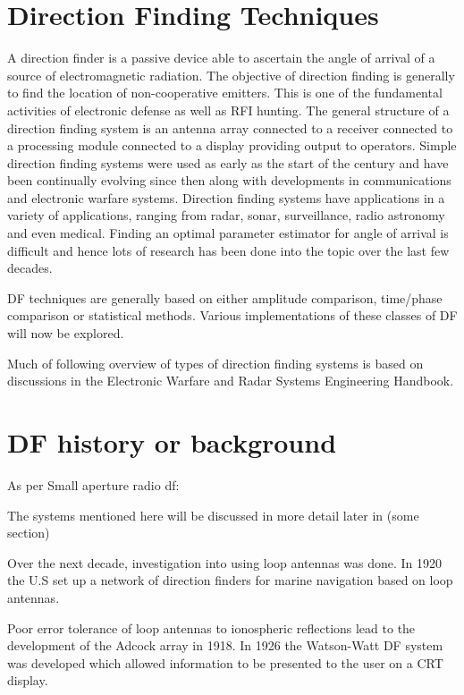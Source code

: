 \section{Direction Finding Techniques}
A direction finder is a passive device able to ascertain the angle of arrival of a source of electromagnetic radiation.
The objective of direction finding is generally to find the location of non-cooperative emitters\cite{poisel2012electronic}.
This is one of the fundamental activities of electronic defense as well as RFI hunting.
The general structure of a direction finding system is an antenna array connected to a receiver connected to a processing module connected to a display providing output to operators.
Simple direction finding systems were used as early as the start of the  century and have been continually evolving since then along with developments in communications and electronic warfare systems.
Direction finding systems have applications in a variety of applications, ranging from radar, sonar, surveillance, radio astronomy and even medical. Finding an optimal parameter estimator for angle of arrival is difficult and hence lots of research has been done into the topic over the last few decades\cite{van2004detection}.

DF techniques are generally based on either amplitude comparison, time/phase comparison or statistical methods\cite{tuncer2009classical}. 
Various implementations of these classes of DF will now be explored.

Much of following overview of types of direction finding systems is based on discussions in the Electronic Warfare and Radar Systems Engineering Handbook\cite{center2012electronic}.

\section{DF history or background}
As per Small aperture radio df:

The systems mentioned here will be discussed in more detail later in (some section)

Over the next decade, investigation into using loop antennas was done. In 1920 the U.S set up a network of direction finders for marine navigation based on loop antennas.

Poor error tolerance of loop antennas to ionospheric reflections lead to the development of the Adcock array in 1918. 
In 1926 the Watson-Watt DF system was developed which allowed information to be presented to the user on a CRT display. 

